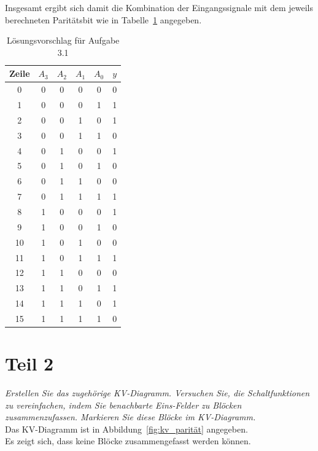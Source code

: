 \noindent
Insgesamt ergibt sich damit die Kombination der Eingangssignale mit dem jeweils berechneten Paritätsbit wie in Tabelle~\ref{tab:paritätsbit} angegeben.

\begin{table}[ht]
    \setlength{\tabcolsep}{0.5em}
    \def\arraystretch{1.5}
    \centering
   \begin{tabular}{|c|c|c|c|c||c|}
        \hline
        \textbf{Zeile} & $A_3$ & $A_2$ & $A_1$ & $A_0$ & $y$ \\
        \hline \hline
        0  & 0 & 0 & 0 & 0 & 0 \\ \hline
        1  & 0 & 0 & 0 & 1 & 1 \\ \hline
        2  & 0 & 0 & 1 & 0 & 1 \\ \hline
        3  & 0 & 0 & 1 & 1 & 0 \\ \hline
        4  & 0 & 1 & 0 & 0 & 1 \\ \hline
        5  & 0 & 1 & 0 & 1 & 0 \\ \hline
        6  & 0 & 1 & 1 & 0 & 0 \\ \hline
        7  & 0 & 1 & 1 & 1 & 1 \\ \hline
        8  & 1 & 0 & 0 & 0 & 1 \\ \hline
        9  & 1 & 0 & 0 & 1 & 0 \\ \hline
        10 & 1 & 0 & 1 & 0 & 0 \\ \hline
        11 & 1 & 0 & 1 & 1 & 1 \\ \hline
        12 & 1 & 1 & 0 & 0 & 0 \\ \hline
        13 & 1 & 1 & 0 & 1 & 1 \\ \hline
        14 & 1 & 1 & 1 & 0 & 1 \\ \hline
        15 & 1 & 1 & 1 & 1 & 0 \\
        \hline
    \end{tabular}
    \caption{Lösungsvorschlag für Aufgabe 3.1}
    \label{tab:paritätsbit}
\end{table}

\section{Teil 2}

\textit{Erstellen Sie das zugehörige KV-Diagramm.
Versuchen Sie, die Schaltfunktionen zu vereinfachen, indem Sie benachbarte Eins-Felder zu Blöcken zusammenzufassen. Markieren Sie diese Blöcke im KV-Diagramm.}\\

\noindent
Das KV-Diagramm ist in Abbildung~\ref{fig:kv_parität} angegeben.\\
Es zeigt sich, dass keine Blöcke zusammengefasst werden können.

